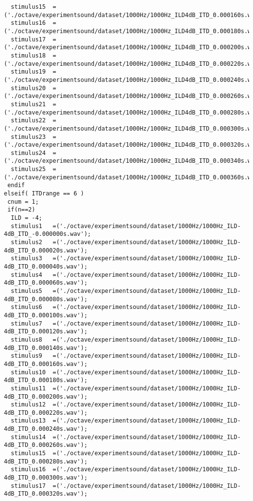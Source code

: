 {\begin{verbatim}
  stimulus15  =('./octave/experimentsound/dataset/1000Hz/1000Hz_ILD4dB_ITD_0.000160s.wav');
  stimulus16  =('./octave/experimentsound/dataset/1000Hz/1000Hz_ILD4dB_ITD_0.000180s.wav');
  stimulus17  =('./octave/experimentsound/dataset/1000Hz/1000Hz_ILD4dB_ITD_0.000200s.wav');
  stimulus18  =('./octave/experimentsound/dataset/1000Hz/1000Hz_ILD4dB_ITD_0.000220s.wav');
  stimulus19  =('./octave/experimentsound/dataset/1000Hz/1000Hz_ILD4dB_ITD_0.000240s.wav');
  stimulus20  =('./octave/experimentsound/dataset/1000Hz/1000Hz_ILD4dB_ITD_0.000260s.wav');
  stimulus21  =('./octave/experimentsound/dataset/1000Hz/1000Hz_ILD4dB_ITD_0.000280s.wav');
  stimulus22  =('./octave/experimentsound/dataset/1000Hz/1000Hz_ILD4dB_ITD_0.000300s.wav');
  stimulus23  =('./octave/experimentsound/dataset/1000Hz/1000Hz_ILD4dB_ITD_0.000320s.wav');
  stimulus24  =('./octave/experimentsound/dataset/1000Hz/1000Hz_ILD4dB_ITD_0.000340s.wav');
  stimulus25  =('./octave/experimentsound/dataset/1000Hz/1000Hz_ILD4dB_ITD_0.000360s.wav');
 endif
elseif( ITDrange == 6 )
 cnum = 1; 
 if(n==2)
  ILD = -4;
  stimulus1   =('./octave/experimentsound/dataset/1000Hz/1000Hz_ILD-4dB_ITD_-0.000000s.wav');
  stimulus2   =('./octave/experimentsound/dataset/1000Hz/1000Hz_ILD-4dB_ITD_0.000020s.wav');
  stimulus3   =('./octave/experimentsound/dataset/1000Hz/1000Hz_ILD-4dB_ITD_0.000040s.wav');
  stimulus4   =('./octave/experimentsound/dataset/1000Hz/1000Hz_ILD-4dB_ITD_0.000060s.wav');
  stimulus5   =('./octave/experimentsound/dataset/1000Hz/1000Hz_ILD-4dB_ITD_0.000080s.wav');
  stimulus6   =('./octave/experimentsound/dataset/1000Hz/1000Hz_ILD-4dB_ITD_0.000100s.wav');
  stimulus7   =('./octave/experimentsound/dataset/1000Hz/1000Hz_ILD-4dB_ITD_0.000120s.wav');
  stimulus8   =('./octave/experimentsound/dataset/1000Hz/1000Hz_ILD-4dB_ITD_0.000140s.wav');
  stimulus9   =('./octave/experimentsound/dataset/1000Hz/1000Hz_ILD-4dB_ITD_0.000160s.wav');
  stimulus10  =('./octave/experimentsound/dataset/1000Hz/1000Hz_ILD-4dB_ITD_0.000180s.wav');
  stimulus11  =('./octave/experimentsound/dataset/1000Hz/1000Hz_ILD-4dB_ITD_0.000200s.wav');
  stimulus12  =('./octave/experimentsound/dataset/1000Hz/1000Hz_ILD-4dB_ITD_0.000220s.wav');
  stimulus13  =('./octave/experimentsound/dataset/1000Hz/1000Hz_ILD-4dB_ITD_0.000240s.wav');
  stimulus14  =('./octave/experimentsound/dataset/1000Hz/1000Hz_ILD-4dB_ITD_0.000260s.wav');
  stimulus15  =('./octave/experimentsound/dataset/1000Hz/1000Hz_ILD-4dB_ITD_0.000280s.wav');
  stimulus16  =('./octave/experimentsound/dataset/1000Hz/1000Hz_ILD-4dB_ITD_0.000300s.wav');
  stimulus17  =('./octave/experimentsound/dataset/1000Hz/1000Hz_ILD-4dB_ITD_0.000320s.wav');

\end{verbatim}}
